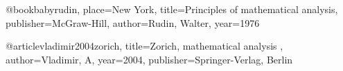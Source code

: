 @book{babyrudin, place={New York}, title={Principles of mathematical analysis}, publisher={McGraw-Hill}, author={Rudin, Walter}, year={1976}}

@article{vladimir2004zorich,
  title={Zorich, mathematical analysis },
  author={Vladimir, A},
  year={2004},
  publisher={Springer-Verlag, Berlin}
}
